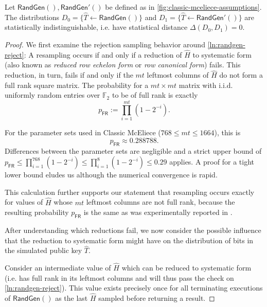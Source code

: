 \begin{lemma} \label{lem:classic-mceliece-randgen-prime}
    Let $\textsf{RandGen}(), \textsf{RandGen}'()$ be defined as in \cref{fig:classic-mceliece-assumptions}.
    The distributions $D_0 = \{ \hat T \gets \textsf{RandGen}() \}$ and $D_1 = \{ \hat T \gets \textsf{RandGen}'() \}$ are statistically indistinguishable, i.e. have statistical distance $\Delta(D_0, D_1) = 0$.
\end{lemma}

\begin{proof}
    We first examine the rejection sampling behavior around \cref{ln:randgen-reject}: A resampling occurs if and only if a reduction of $\hat H$ to systematic form (also known as \emph{reduced row echelon form} or \emph{row canonical form}) fails. This reduction, in turn, fails if and only if the $mt$ leftmost columns of $\hat H$ do not form a full rank square matrix.
    The probability for a $mt \times mt$ matrix with i.i.d. uniformly random entries over $\mathbb F_2$ to be of full rank is exactly~\cite{DBLP:journals/corr/SalmondGGC14}
    \[ p_\mathsf{FR} := \prod_{i=1}^{mt} \left( 1-2^{-i} \right). \]
    
    For the parameter sets used in Classic McEliece ($768 \leq mt \leq 1664$), this is \[ p_\mathsf{FR} \approx 0.288788 . \]
    Differences between the parameter sets are negligible and a strict upper bound of $p_\mathsf{FR} \leq \prod_{i=1}^{768} \left( 1-2^{-i} \right) \leq \prod_{i=1}^{8} \left( 1-2^{-i} \right) \leq 0.29$ applies. A proof for a tight lower bound eludes us although the numerical convergence is rapid.
    
    This calculation further supports our statement that resampling occurs exactly for values of $\hat H$ whose $mt$ leftmost columns are not full rank, because the resulting probability $p_\mathsf{FR}$ is the same as was experimentally reported in \cite[security.pdf: Section 4.2]{NISTPQC-R4:ClassicMcEliece22}.
    
    After understanding which reductions fail, we now consider the possible influence that the reduction to systematic form might have on the distribution of bits in the simulated public key $\hat T$.

    Consider an intermediate value of $\hat H$ which can be reduced to systematic form (i.e. has full rank in its leftmost columns and will thus pass the check on \cref{ln:randgen-reject}). This value exists precisely once for all terminating executions of $\textsf{RandGen}()$ as the last $\hat H$ sampled before returning a result.


\end{proof}
